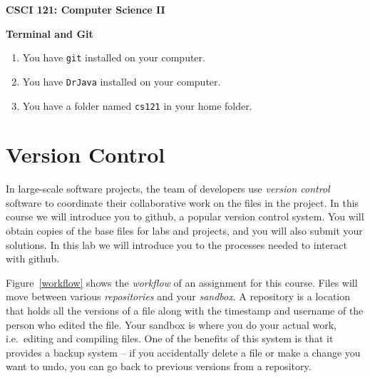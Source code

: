 \documentclass[11pt]{article}
\begin{document}
\centerline{\Large\bf CSCI 121: Computer Science II}

\vspace{.1in}

\centerline{\large\bf Terminal and Git}

\vspace{.25in}


\begin{enumerate}
\item You have {\tt git} installed on your computer.
\item You have {\tt DrJava} installed on your computer.
\item You have a folder named {\tt cs121} in your home folder.
\end{enumerate}


\section*{Version Control}

In large-scale software projects, the team of developers use {\em version control} software to coordinate their collaborative work on the files in the project.  In this course we will introduce you to github, a popular version control system.  You will obtain copies of the base files for labs and projects, and you will also submit your solutions.  In this lab we will introduce you to the processes needed to interact with github.

Figure~\ref{workflow} shows the {\em workflow} of an assignment for this course.  Files will move between various {\em repositories} and your {\em sandbox}.  A repository is a location that holds all the versions of a file along with the timestamp and username of the person who edited the file.  Your sandbox is where you do your actual work, i.e.~editing and compiling files.  One of the benefits of this system is that it provides a backup system -- if you accidentally delete a file or make a change you want to undo, you can go back to previous versions from a repository.
\end{document}

